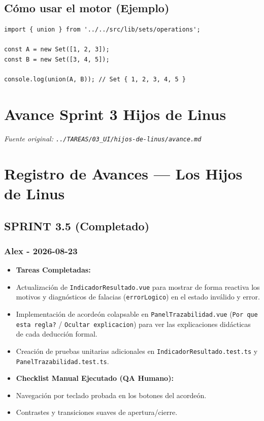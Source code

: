 \documentclass[11pt,a4paper,openany]{book}
\begin{document}
\subsection{Cómo usar el motor (Ejemplo)}
\begin{lstlisting}[language={},basicstyle=\ttfamily\scriptsize]
import { union } from '../../src/lib/sets/operations';

const A = new Set([1, 2, 3]);
const B = new Set([3, 4, 5]);

console.log(union(A, B)); // Set { 1, 2, 3, 4, 5 }
\end{lstlisting}


\section{Avance Sprint 3 Hijos de Linus}
\textit{Fuente original: \texttt{../TAREAS/03\_UI/hijos-de-linus/avance.md}}

\section{Registro de Avances --- Los Hijos de Linus}

\subsection{SPRINT 3.5 (Completado)}

\subsubsection{Alex - 2026-08-23}
\begin{itemize}[leftmargin=*]
\item \textbf{Tareas Completadas:}
\item Actualización de \texttt{IndicadorResultado.vue} para mostrar de forma reactiva los motivos y diagnósticos de falacias (\texttt{errorLogico}) en el estado inválido y error.
\item Implementación de acordeón colapsable en \texttt{PanelTrazabilidad.vue} (\texttt{Por que esta regla?} / \texttt{Ocultar explicacion}) para ver las explicaciones didácticas de cada deducción formal.
\item Creación de pruebas unitarias adicionales en \texttt{IndicadorResultado.test.ts} y \texttt{PanelTrazabilidad.test.ts}.
\item \textbf{Checklist Manual Ejecutado (QA Humano):}
\item [x] Navegación por teclado probada en los botones del acordeón.
\item [x] Contrastes y transiciones suaves de apertura/cierre.
\end{itemize}
\end{document}
